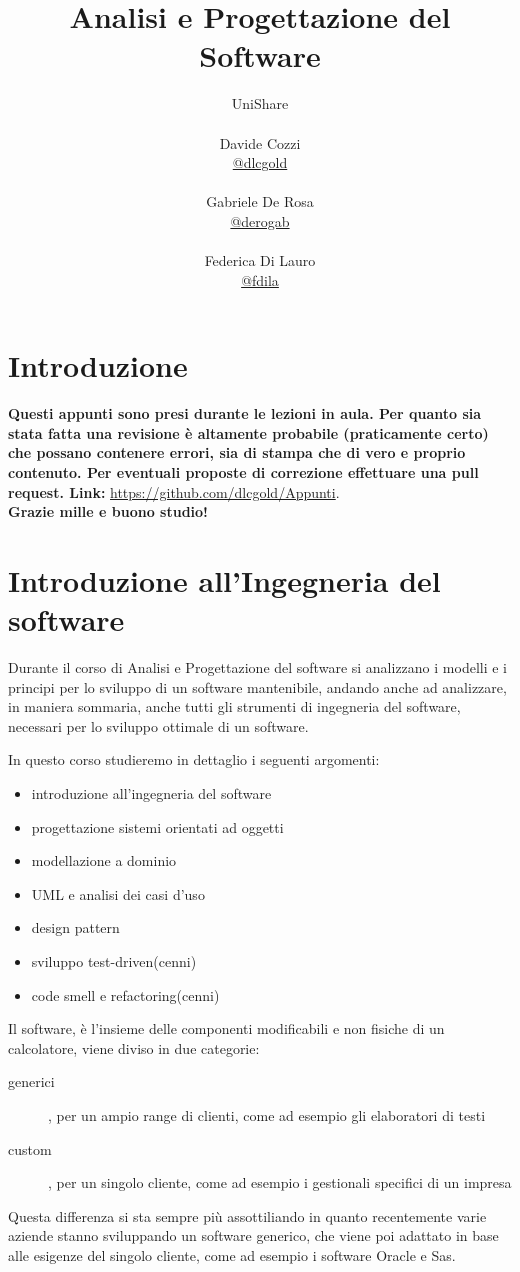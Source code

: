 \documentclass[a4paper,12pt, oneside]{book}
\title{Analisi e Progettazione del Software}
\author{UniShare\\\\Davide Cozzi\\\href{https://t.me/dlcgold}{@dlcgold}\\\\Gabriele De Rosa\\\href{https://t.me/derogab}{@derogab} \\\\Federica Di Lauro\\\href{https://t.me/f_dila}{@f\textunderscore dila}}
\date{}
\begin{document}
\maketitle


\newtheorem{teorema}{Teorema}
\newtheorem{definizione}{Definizione}
\newtheorem{esempio}{Esempio}
\newtheorem{corollario}{Corollario}
\newtheorem{lemma}{Lemma}
\newtheorem{osservazione}{Osservazione}
\newtheorem{nota}{Nota}
\newtheorem{esercizio}{Esercizio}
\tableofcontents
\renewcommand{\chaptermark}[1]{%
\markboth{\chaptername
\ \thechapter.\ #1}{}}
\renewcommand{\sectionmark}[1]{\markright{\thesection.\ #1}}
\chapter{Introduzione}
\textbf{Questi appunti sono presi durante le lezioni in aula. Per quanto sia stata fatta una revisione è altamente probabile (praticamente certo) che possano contenere errori, sia di stampa che di vero e proprio contenuto. Per eventuali proposte di correzione effettuare una pull request. Link: } \url{https://github.com/dlcgold/Appunti}.\\
\textbf{Grazie mille e buono studio!}
\chapter{Introduzione all'Ingegneria del software}
Durante il corso di Analisi e Progettazione del software si analizzano i modelli e i principi per lo sviluppo di un 
software mantenibile, andando anche ad analizzare, in maniera sommaria, anche tutti gli strumenti di 
ingegneria del software, necessari per lo sviluppo ottimale di un software.

In questo corso studieremo in dettaglio i seguenti argomenti:
\begin{itemize}
    \item introduzione all'ingegneria del software
    \item progettazione sistemi orientati ad oggetti
    \item modellazione a dominio
    \item UML e analisi dei casi d'uso
    \item design pattern
    \item sviluppo test-driven(cenni)
    \item code smell e refactoring(cenni)
\end{itemize}
Il software, è l'insieme delle componenti modificabili e non fisiche di un calcolatore, viene diviso in due categorie:
\begin{description}
    \item [generici], per un ampio range di clienti, come ad esempio gli elaboratori di testi
    \item [custom], per un singolo cliente, come ad esempio i gestionali specifici di un impresa
\end{description}
Questa differenza si sta sempre più assottiliando in quanto recentemente varie aziende stanno sviluppando un 
software generico, che viene poi adattato in base alle esigenze del singolo cliente, 
come ad esempio i software Oracle e Sas.
\end{document}
